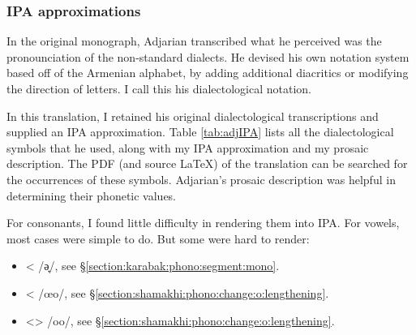 \subsubsection{IPA approximations}\label{sec:HossepIntro:phonotransc:adj:ipa}

In the original monograph, Adjarian transcribed what he perceived was the pronounciation of the non-standard dialects. He devised his own notation system based off of the Armenian alphabet, by adding additional diacritics or modifying the direction of letters. I call this his dialectological notation. 

In this translation, I retained his original dialectological transcriptions and supplied  an IPA approximation. Table \ref{tab:adjIPA}  lists all the dialectological symbols that he used, along with my IPA approximation and my  prosaic description. The PDF (and source LaTeX) of the translation can be searched for the occurrences of these symbols. Adjarian's prosaic description was  helpful in determining their phonetic values.  

For consonants, I found little difficulty in rendering them into IPA. For vowels, most cases were simple to do. But some were hard to render:  
\begin{itemize}
	\item < /ə̟/,  see \S\ref{section:karabak:phono:segment:mono}. 
	\item < /œo/,  see \S\ref{section:shamakhi:phono:change:o:lengthening}. 
	\item <> /oo/,  see \S\ref{section:shamakhi:phono:change:o:lengthening}.

\end{itemize}


